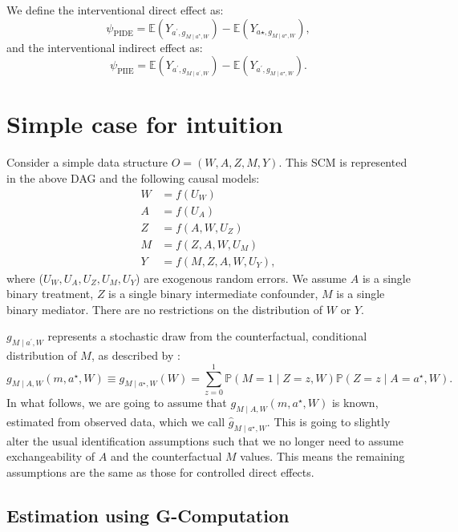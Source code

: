 \documentclass[
  12pt, krantz2,
]{book}
\theoremstyle{definition}
\theoremstyle{definition}
\theoremstyle{definition}
\renewcommand{\P}{\mathbb{P}}
\newcommand{\E}{\mathbb{E}}
\newcommand{\1}{\mathbbm{1}}
\begin{document}
We define the interventional direct effect as:
\begin{equation*}
  \psi_{\text{PIDE}} = \E(Y_{a^\prime,g_{M \mid a^\star,W}}) -
    \E(Y_{a\star,g_{M \mid a^\star,W}}),
\end{equation*}
and the interventional indirect effect as:
\begin{equation*}
  \psi_{\text{PIIE}} = \E(Y_{a^\prime,g_{M \mid a^\prime,W}}) -
    \E(Y_{a^\prime,g_{M \mid a^\star,W}}).
\end{equation*}

\hypertarget{simple-case-for-intuition-1}{%
\section{Simple case for intuition}\label{simple-case-for-intuition-1}}

Consider a simple data structure \(O=(W, A, Z, M, Y)\). This SCM is represented in
the above DAG and the following causal models:
\begin{align*}
  W &= f(U_W)\\
  A &= f(U_A)\\
  Z &= f(A, W, U_Z)\\
  M &= f(Z, A, W, U_M)\\
  Y &= f(M, Z, A, W, U_Y),
\end{align*}
where (\(U_W, U_A, U_Z, U_M, U_Y\)) are exogenous random errors. We assume \(A\) is
a single binary treatment, \(Z\) is a single binary intermediate confounder, \(M\)
is a single binary mediator. There are no restrictions on the distribution of
\(W\) or \(Y\).

\(g_{M \mid a^\prime,W}\) represents a stochastic draw from the counterfactual,
conditional distribution of \(M\), as described by
\citet{vanderweele2016mediation}:
\begin{equation*}
  g_{M \mid A,W}(m, a^{\star}, W) \equiv g_{M \mid a^{\star}, W}(W) =
    \sum_{z=0}^1 \P(M=1 \mid Z=z,W) \P(Z=z \mid A=a^{\star}, W).
\end{equation*}
In what follows, we are going to assume that \(g_{M \mid A,W}(m, a^{\star}, W)\)
is known, estimated from observed data, which we call
\(\hat{g}_{M \mid a^{\star}, W}\). This is going to slightly alter the usual
identification assumptions such that we no longer need to assume exchangeability
of \(A\) and the counterfactual \(M\) values. This means the remaining assumptions
are the same as those for controlled direct effects.

\hypertarget{estimation-using-g-computation}{%
\subsection{Estimation using G-Computation}\label{estimation-using-g-computation}}
\end{document}
